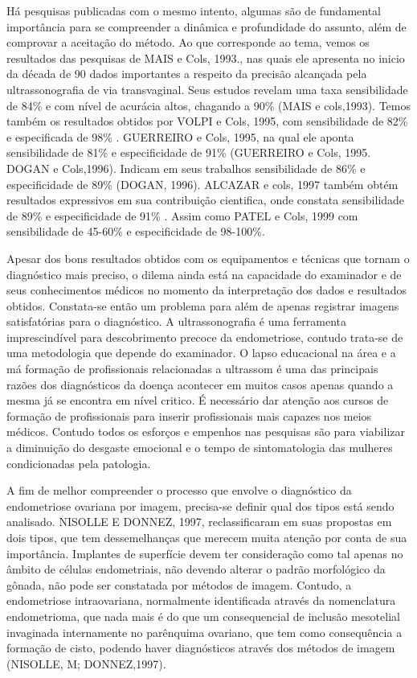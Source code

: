 \documentclass[12pt]{article} %
\begin{document}
Há pesquisas publicadas com o mesmo intento, algumas são de fundamental importância para se compreender a dinâmica e profundidade do assunto, além de comprovar a aceitação do método. Ao que corresponde ao tema, vemos os resultados das pesquisas de MAIS e Cols, 1993., nas quais ele apresenta no inicio da década de 90 dados importantes a respeito da precisão alcançada pela ultrassonografia de via transvaginal. Seus estudos revelam uma taxa sensibilidade de 84\% e com nível de acurácia altos, chagando a 90\% (MAIS e cols,1993). Temos também os resultados obtidos por VOLPI e Cols, 1995, com sensibilidade de 82\% e especificada de 98\% .  GUERREIRO e Cols, 1995,  na qual ele aponta sensibilidade de 81\% e especificidade de 91\% (GUERREIRO e Cols, 1995. DOGAN e Cols,1996). Indicam em seus trabalhos sensibilidade de 86\% e especificidade de 89\% (DOGAN, 1996). ALCAZAR e cols, 1997 também obtém resultados expressivos em sua contribuição cientifica, onde constata sensibilidade de 89\% e especificidade de 91\% . Assim como PATEL e Cols, 1999 com sensibilidade de 45-60\% e especificidade de 98-100\%. 

Apesar dos bons resultados obtidos com os equipamentos e técnicas que tornam o
diagnóstico mais preciso, o dilema ainda está na capacidade do examinador e de seus conhecimentos médicos no momento da interpretação dos dados e resultados obtidos.  Constata-se então um problema para além de apenas registrar imagens satisfatórias para o diagnóstico. A ultrassonografia é uma ferramenta imprescindível para descobrimento precoce da endometriose, contudo trata-se de uma metodologia que depende do examinador. O lapso educacional na área e a má formação de profissionais relacionadas a ultrassom é uma das principais razões dos diagnósticos da doença acontecer em muitos casos apenas quando a mesma já se encontra em nível critico. É necessário dar atenção aos cursos de formação de profissionais para inserir profissionais mais capazes nos meios médicos. Contudo todos os esforços e empenhos nas pesquisas são para viabilizar a diminuição do desgaste emocional e o tempo de sintomatologia das mulheres condicionadas pela patologia. 

A fim de melhor compreender o processo que envolve o diagnóstico da endometriose ovariana por imagem, precisa-se definir qual dos tipos está sendo analisado. NISOLLE E DONNEZ, 1997, reclassificaram em suas propostas em dois tipos, que tem dessemelhanças que merecem muita atenção por conta de sua importância. Implantes de superfície devem ter consideração como tal apenas no âmbito de células endometriais, não devendo alterar o padrão morfológico da gônada, não pode ser constatada por métodos de imagem. Contudo, a endometriose intraovariana, normalmente identificada através da nomenclatura endometrioma, que nada mais é do que um consequencial de inclusão mesotelial invaginada internamente no parênquima ovariano, que tem como consequência a formação de cisto, podendo haver diagnósticos através dos métodos de imagem (NISOLLE, M; DONNEZ,1997). 
\end{document}
